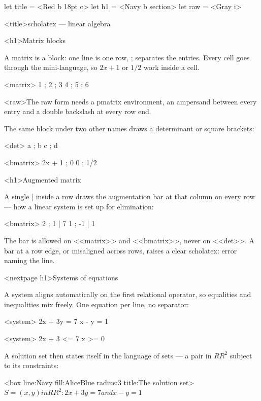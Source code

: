 \documentclass[
  margins=18,
  font=Latin Modern Roman,
  size=12,
  linespread=1.4,
  lang=en
]{scholatex}
\begin{document}
let title = <Red b 18pt c>
let h1    = <Navy b section>
let raw   = <Gray i>

<title>scholatex — linear algebra

<h1>Matrix blocks

A matrix is a block: one line is one row, ; separates the entries.
Every cell goes through the mini-language, so $2x + 1$ or $1/2$ work
inside a cell.

<matrix>{
	1 ; 2 ; 3
	4 ; 5 ; 6
}

<raw>The raw form needs a pmatrix environment, an ampersand between
every entry and a double backslash at every row end.

The same block under two other names draws a determinant or square
brackets:

<det>{
	a ; b
	c ; d
}

<bmatrix>{
	2x + 1 ; 0
	0 ; 1/2
}

<h1>Augmented matrix

A single | inside a row draws the augmentation bar at that column on
every row — how a linear system is set up for elimination:

<bmatrix>{
	2 ; 1 | 7
	1 ; -1 | 1
}

The bar is allowed on <<matrix>> and <<bmatrix>>, never on
<<det>>. A bar at a row edge, or misaligned across rows, raises a
clear scholatex: error naming the line.

<nextpage h1>Systems of equations

A system aligns automatically on the first relational operator, so
equalities and inequalities mix freely. One equation per line, no
separator:

<system>{
	2x + 3y = 7
	x - y = 1
}

<system>{
	2x + 3 <= 7
	x >= 0
}

A solution set then states itself in the language of sets — a pair in
$RR^2$ subject to its constraints:

<box line:Navy fill:AliceBlue radius:3 title:{The solution set}>{
	$S = {{ (x, y) in RR^2 : 2x + 3y = 7 and x - y = 1 }}$
}
\end{document}
